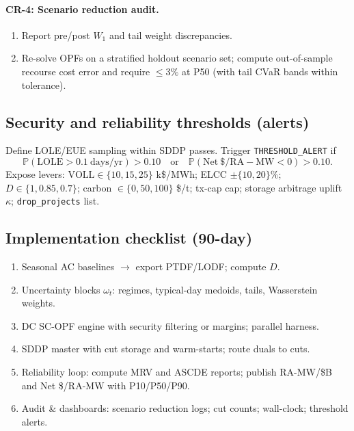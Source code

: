\documentclass[11pt]{article}
\newcommand{\Prob}{\mathbb{P}}
\numberwithin{equation}{section}
\theoremstyle{definition}
\theoremstyle{remark}
\begin{document}
\paragraph{CR-4: Scenario reduction audit.}
\begin{enumerate}[leftmargin=1.2em,itemsep=0.25em]
  \item Report pre/post $W_1$ and tail weight discrepancies.
  \item Re-solve OPFs on a stratified holdout scenario set; compute out-of-sample recourse cost error and require $\le 3\%$ at P50 (with tail CVaR bands within tolerance).
\end{enumerate}

\subsection{ Security and reliability thresholds (alerts)}
Define LOLE/EUE sampling within SDDP passes. Trigger \texttt{THRESHOLD\_ALERT} if
\[
\Prob(\mathrm{LOLE} > 0.1\ \mathrm{days/yr}) > 0.10\quad\text{or}\quad
\Prob(\mathrm{Net}\ \$/\mathrm{RA\!-\!MW} < 0) > 0.10.
\]
Expose levers: $\mathrm{VOLL}\in\{10,15,25\}$ k\$/MWh; ELCC $\pm\{10,20\}\%$; $D\in\{1,0.85,0.7\}$; carbon $\in\{0,50,100\}$ \$/t; tx-cap cap; storage arbitrage uplift $\kappa$; \texttt{drop\_projects} list.

\subsection{ Implementation checklist (90-day)}
\begin{enumerate}[leftmargin=1.2em,itemsep=0.25em]
  \item Seasonal AC baselines $\rightarrow$ export PTDF/LODF; compute $D$.
  \item Uncertainty blocks $\omega_t$: regimes, typical-day medoids, tails, Wasserstein weights.
  \item DC SC-OPF engine with security filtering or margins; parallel harness.
  \item SDDP master with cut storage and warm-starts; route duals to cuts.
  \item Reliability loop: compute MRV and ASCDE reports; publish RA-MW/\$B and Net \$/RA-MW with P10/P50/P90.
  \item Audit \& dashboards: scenario reduction logs; cut counts; wall-clock; threshold alerts.
\end{enumerate}
\end{document}
